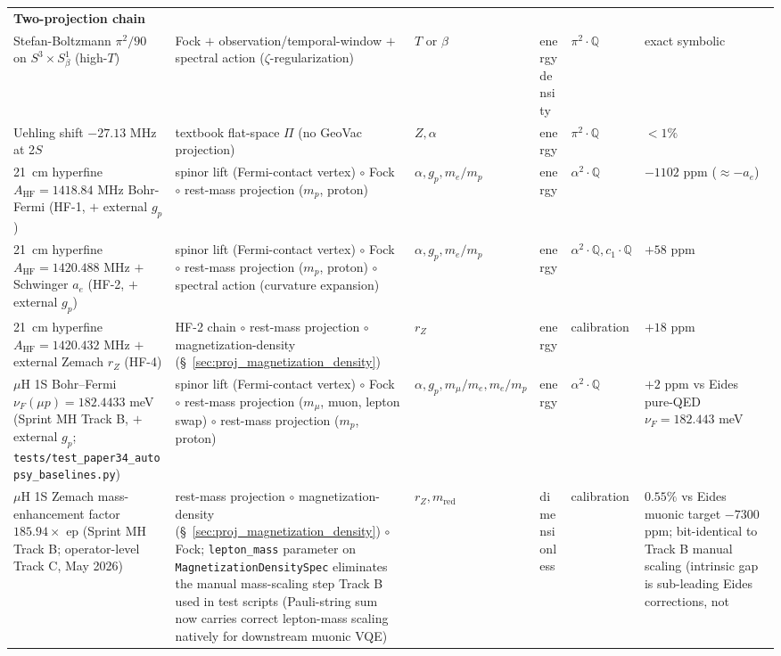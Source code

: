 \documentclass[11pt]{article}
\begin{document}
\begin{longtable}{p{3.5cm} p{2.8cm} p{1.3cm} p{2.2cm} p{1.8cm} p{1.4cm}}
\midrule
\textbf{Two-projection chain} & & & & & \\
Stefan-Boltzmann $\pi^2/90$ on $S^3 \times S^1_\beta$ (high-$T$) &
Fock $+$ observation/temporal-window $+$ spectral action
($\zeta$-regularization) & $T$ or $\beta$ & energy density &
$\pi^2 \cdot \mathbb{Q}$ & exact symbolic \\
Uehling shift $-27.13$ MHz at 2$S$ & textbook flat-space $\Pi$ (no GeoVac projection) &
$Z, \alpha$ & energy & $\pi^2{\cdot}\mathbb{Q}$ & $<1\%$ \\
21~cm hyperfine $A_\text{HF} = 1418.84$ MHz Bohr-Fermi (HF-1, $+$ external
$g_p$) & spinor lift (Fermi-contact vertex) $\circ$ Fock $\circ$ rest-mass
projection ($m_p$, proton) & $\alpha, g_p, m_e/m_p$ & energy &
$\alpha^2{\cdot}\mathbb{Q}$ & $-1102$ ppm ($\approx -a_e$) \\
21~cm hyperfine $A_\text{HF} = 1420.488$ MHz $+$ Schwinger $a_e$
(HF-2, $+$ external $g_p$) & spinor lift (Fermi-contact vertex) $\circ$
Fock $\circ$ rest-mass projection ($m_p$, proton) $\circ$ spectral
action (curvature expansion) & $\alpha, g_p, m_e/m_p$ & energy &
$\alpha^2{\cdot}\mathbb{Q}, c_1 \cdot \mathbb{Q}$ & $+58$ ppm \\
21~cm hyperfine $A_\text{HF} = 1420.432$ MHz $+$ external Zemach $r_Z$
(HF-4) & HF-2 chain $\circ$ rest-mass projection $\circ$
magnetization-density (\S~\ref{sec:proj_magnetization_density}) &
$r_Z$ & energy & calibration & $+18$ ppm  \\
$\mu$H 1S Bohr--Fermi $\nu_F(\mu p) = 182.4433$ meV (Sprint MH Track B,
$+$ external $g_p$; \texttt{tests/test\_paper34\_autopsy\_baselines.py})
& spinor lift (Fermi-contact vertex) $\circ$ Fock
$\circ$ rest-mass projection ($m_\mu$, muon, lepton swap) $\circ$
rest-mass projection ($m_p$, proton) & $\alpha, g_p, m_\mu/m_e, m_e/m_p$
& energy & $\alpha^2 \cdot \mathbb{Q}$ &
$+2$ ppm vs Eides pure-QED $\nu_F = 182.443$ meV \\
$\mu$H 1S Zemach mass-enhancement factor $185.94 \times$ ep
(Sprint MH Track B; operator-level Track C, May 2026) & rest-mass
projection $\circ$ magnetization-density
(\S~\ref{sec:proj_magnetization_density}) $\circ$ Fock; \texttt{lepton\_mass}
parameter on \texttt{MagnetizationDensitySpec} eliminates the manual
mass-scaling step Track B used in test scripts (Pauli-string sum now
carries correct lepton-mass scaling natively for downstream muonic
VQE) & $r_Z, m_\text{red}$ & dimensionless & calibration &
$0.55\%$ vs Eides muonic target $-7300$ ppm; bit-identical to Track B
manual scaling (intrinsic gap is sub-leading Eides corrections, not

\end{longtable}
\end{document}
